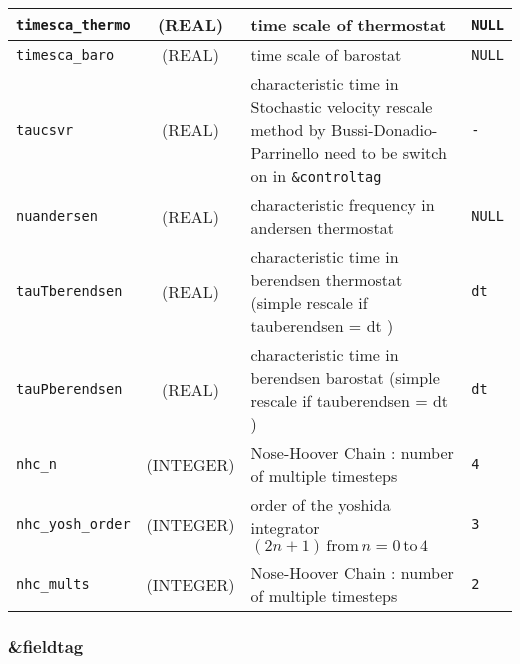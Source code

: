 \documentclass[a4paper]{article}
\begin{document}
\begin{longtable}{l|c|m{8cm}|m{2cm}}
\hline
\rule[-0.75cm]{0cm}{1.5cm}
\verb?timesca_thermo? & (REAL)         &  time scale of thermostat                                                          & \verb?NULL? \\
\hline
\rule[-0.75cm]{0cm}{1.5cm}
\verb?timesca_baro? & (REAL)          &  time scale of barostat                                                             & \verb?NULL? \\
\hline
\rule[-0.75cm]{0cm}{1.5cm}
\verb?taucsvr?     & (REAL)           &  characteristic time in Stochastic velocity rescale method by Bussi-Donadio-Parrinello
                                         need to be switch on in \verb?&controltag?                                          & \verb?-? \\
\hline
\rule[-0.75cm]{0cm}{1.5cm}
\verb?nuandersen?    & (REAL)         &  characteristic frequency in andersen thermostat                                    & \verb?NULL? \\
\hline
\rule[-0.75cm]{0cm}{1.5cm}
\verb?tauTberendsen?  & (REAL)        &  characteristic time in berendsen thermostat (simple rescale if tauberendsen = dt ) & \verb?dt? \\
\hline
\rule[-0.75cm]{0cm}{1.5cm}
\verb?tauPberendsen?  & (REAL)        &  characteristic time in berendsen barostat   (simple rescale if tauberendsen = dt ) & \verb?dt? \\
\hline
\rule[-0.75cm]{0cm}{1.5cm}
\verb?nhc_n?          & (INTEGER)     &  Nose-Hoover Chain : number of multiple timesteps                                   & \verb?4? \\
\hline
\rule[-0.75cm]{0cm}{1.5cm}
\verb?nhc_yosh_order? & (INTEGER)     &  order of the yoshida integrator $(2n+1) \, \mathrm{from}\, n=0\, \mathrm{to}\, 4$       & \verb?3? \\
\hline
\rule[-0.75cm]{0cm}{1.5cm}
\verb?nhc_mults?      & (INTEGER)     &  Nose-Hoover Chain : number of multiple timesteps                                   & \verb?2? \\
\hline
\hline
\end{longtable}


\subsubsection{\&fieldtag}
\end{document}

